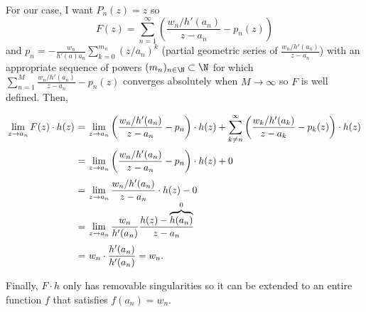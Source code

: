 For our case, I want $P_n(z) = z$ so
\[ F(z) = \sum_{n = 1}^{\infty} \left( \frac{w_n/h'(a_n)}{z-a_n} - p_n(z)  \right) \]
and $p_n = -\frac{w_n}{h'(a)a_n}\sum_{k = 0}^{m_n} (z/a_n)^k $ (partial geometric series of $\frac{w_n/h'(a_n)}{z-a_n}$) with an appropriate sequence of powers $(m_n)_{n\in \N} \subset \N$ for which $\sum_{n=1}^M \frac{w_n/h'(a_n)}{z-a_n} - p_n(z)$ converges absolutely when $M \to \infty$ so $F$ is well defined. Then,
\[ \everymath{\displaystyle}
\arraycolsep=1.8pt\def\arraystretch{2.5}
\begin{array}{rcl}
    \lim_{z \to a_n} F(z) \cdot h(z) & = & \lim_{z \to a_n} \left( \frac{w_n/h'(a_n)}{z-a_n} - p_n \right) \cdot h(z) + \sum_{k\neq n}^{\infty} \left( \frac{w_k/h'(a_k)}{z-a_k} - p_k(z) \right) \cdot h(z)\\
    & = & \lim_{z \to a_n} \left( \frac{w_n/h'(a_n)}{z-a_n} - p_n \right) \cdot h(z) + 0\\
    & = & \lim_{z \to a_n} \frac{w_n/h'(a_n)}{z-a_n} \cdot h(z) - 0\\
    & = & \lim_{z \to a_n} \frac{w_n}{h'(a_n)} \frac{h(z) - \overbrace{h(a_n)}^{0} }{z-a_n}\\
    & = & w_n \cdot \frac{h'(a_n)}{h'(a_n)} = w_n.
\end{array}\]

Finally, $F\cdot h$ only has removable singularities so it can be extended to an entire function $f$ that satisfies $f(a_n) = w_n$.